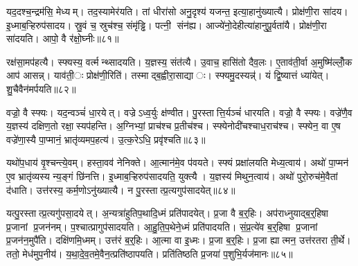 यद॒दश्च॒न्द्रम॑सि॒ मेध्यम्। तद॒स्यामेर॑यति। तां धीरा॑सो अनु॒दृश्य॑ यजन्त॒ इत्या॒हानु॑ख्यात्यै। प्रोक्ष॑णी॒रा सा॑दय। इ॒ध्माब॒ऱ्हिरुप॑सादय। स्रु॒वं च॒ स्रुच॑श्च॒ संमृ॑ड्ढि। पत्नी॒ संन॑ह्य। आज्ये॑नो॒देहीत्या॑हानुपू॒र्वता॑यै। प्रोक्ष॑णी॒रा सा॑दयति। आपो॒ वै र॑क्षो॒घ्नीः॥८१॥

रक्ष॑सा॒मप॑हत्यै। स्फ्यस्य॒ वर्त्मन्थ्सादयति। य॒ज्ञस्य॒ संत॑त्यै। उ॒वाच॒ हासि॑तो दैव॒लः। ए॒ताव॑ती॒र्वा अ॒मुष्मि॑ल्लोँ॒क आप॑ आसन्न्। याव॑ती॒ः प्रोक्ष॑णी॒रिति॑। तस्माद्ब॒ह्वीरा॒साद्याः। स्फ्यमु॒दस्यन्न्॑। यं द्वि॒ष्यात्तं ध्या॑येत्। शु॒चैवैन॑मर्पयति॥८२॥


वज्रो॒ वै स्फ्यः। यद॒न्वञ्चं॑ धा॒रयेत्। वज्रेऽध्व॒र्युः क्ष॑ण्वीत। पु॒रस्तात्ति॒र्यञ्चं॑ धारयति। वज्रो॒ वै स्फ्यः। वज्रे॑णै॒व य॒ज्ञस्य॑ दक्षिण॒तो रक्षा॒स्यप॑हन्ति। अ॒ग्निभ्यां॒ प्राच॑श्च प्र॒तीच॑श्च। स्फ्येनोदी॑चश्चाध॒राच॑श्च। स्फ्येन॒ वा ए॒ष वज्रे॑णा॒स्यै पा॒प्मानं॒ भ्रातृ॑व्यमप॒हत्य॑। उ॒त्क॒रेऽधि॒ प्रवृ॑श्चति॥८३॥

यथो॑प॒धाय॑ वृ॒श्चन्त्ये॒वम्। हस्ता॒वव॑ नेनिक्ते। आ॒त्मान॑मे॒व प॑वयते। स्फ्यं प्रक्षा॑लयति मेध्य॒त्वाय॑। अथो॑ पा॒प्मन॑ ए॒व भ्रातृ॑व्यस्य न्य॒ङ्गं छि॑नत्ति। इ॒ध्माब॒ऱ्हिरुप॑सादयति॒ युक्त्यै। य॒ज्ञस्य॑ मिथुन॒त्वाय॑। अथो॑ पुरो॒रुच॑मे॒वैतां द॑धाति। उत्त॑रस्य॒ कर्म॒णोऽनु॑ख्यात्यै। न पु॒रस्तात्प्र॒त्यगुप॑सादयेत्॥८४॥

यत्पु॒रस्तात्प्र॒त्यगु॑पसा॒दयेत्। अ॒न्यत्रा॑हुतिप॒थादि॒ध्मं प्रति॑पादयेत्। प्र॒जा वै ब॒र्॒हिः। अप॑राध्नुयाद्ब॒र्॒हिषा प्र॒जानां प्र॒जन॑नम्। प॒श्चात्प्रागुप॑सादयति। आ॒हु॒ति॒प॒थेने॒ध्मं प्रति॑पादयति। सं॒प्र॒त्ये॑व ब॒र्॒हिषा प्र॒जानां प्र॒जन॑न॒मुपै॑ति। दक्षि॑णमि॒ध्मम्। उत्त॑रं ब॒र्॒हिः। आ॒त्मा वा इ॒ध्मः। प्र॒जा ब॒र्॒हिः। प्र॒जा ह्यात्मन॒ उत्त॑रतरा ती॒र्थे। ततो॒ मेध॑मुप॒नीय॑। य॒था॒दे॒व॒तमे॒वैन॒त्प्रति॑ष्ठापयति। प्रति॑तिष्ठति प्र॒जया॑ प॒शुभि॒र्यज॑मानः॥८५॥




